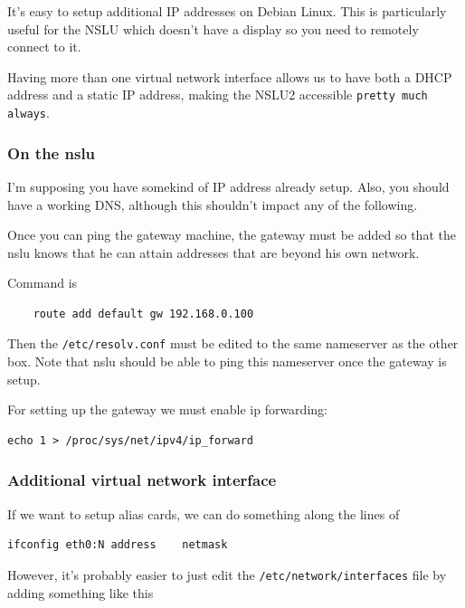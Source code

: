 It's easy to setup additional IP addresses on Debian Linux. This is
particularly useful for the NSLU which doesn't have a display so you
need to remotely connect to it.

Having more than one virtual network interface allows us to have both a
DHCP address and a static IP address, making the NSLU2 accessible
\texttt{pretty much always}.

\hypertarget{on-the-nslu}{%
\subsubsection{On the nslu}\label{on-the-nslu}}

I'm supposing you have somekind of IP address already setup. Also, you
should have a working DNS, although this shouldn't impact any of the
following.

Once you can ping the gateway machine, the gateway must be added so that
the nslu knows that he can attain addresses that are beyond his own
network.

Command is

\begin{verbatim}
	route add default gw 192.168.0.100
\end{verbatim}

Then the \texttt{/etc/resolv.conf} must be edited to the
same nameserver as the other box. Note that nslu should be able to ping
this nameserver once the gateway is setup.

For setting up the gateway we must enable ip forwarding:

\begin{verbatim}
echo 1 > /proc/sys/net/ipv4/ip_forward
\end{verbatim}

\hypertarget{additional-virtual-network-interface}{%
\subsubsection{Additional virtual network
interface}\label{additional-virtual-network-interface}}

If we want to setup alias cards, we can do something along the lines of

\begin{verbatim}
ifconfig eth0:N address    netmask
\end{verbatim}

However, it's probably easier to just edit the
\texttt{/etc/network/interfaces} file by adding something
like this

